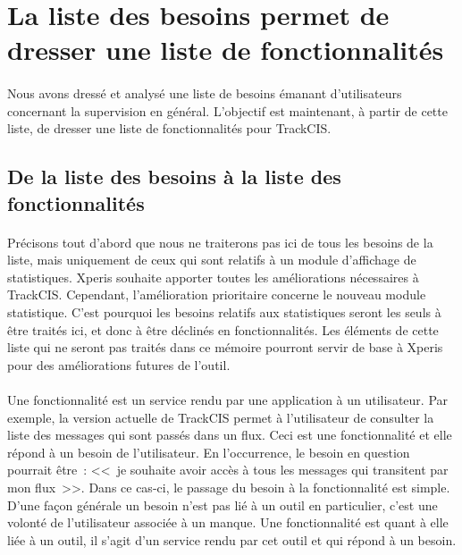 	\section{La liste des besoins permet de dresser une liste de fonctionnalités}
		\paragraph{}%
		Nous avons dressé et analysé une liste de besoins émanant d'utilisateurs
		concernant la supervision en général. L'objectif est maintenant, à partir de
		cette liste, de dresser une liste de fonctionnalités pour TrackCIS.
		
		\subsection{De la liste des besoins à la liste des fonctionnalités}
			\paragraph{}%
			Précisons tout d'abord que nous ne traiterons pas ici de tous les besoins de la
			liste, mais uniquement de ceux qui sont relatifs à un module d'affichage de
			statistiques. Xperis souhaite apporter toutes les améliorations nécessaires à
			TrackCIS. Cependant, l'amélioration prioritaire concerne le nouveau module
			statistique. C'est pourquoi les besoins relatifs aux statistiques seront
			les seuls à être traités ici, et donc à être déclinés en
			fonctionnalités.\newline
			Les éléments de cette liste qui ne seront pas traités dans ce mémoire
			pourront servir de base à Xperis pour des améliorations futures de l'outil.
		
			\paragraph{}%
			Une fonctionnalité est un service rendu par une application à un utilisateur.
			Par exemple, la version actuelle de TrackCIS permet à l'utilisateur de
			consulter la liste des messages qui sont passés dans un flux. Ceci est une
			fonctionnalité et elle répond à un besoin de l'utilisateur. En l'occurrence,
			le besoin en question pourrait être~: <<~je souhaite avoir accès à tous les
			messages qui transitent par mon flux~>>.
			Dans ce cas-ci, le passage du besoin à la fonctionnalité est simple. D’une
			façon générale un besoin n'est pas lié à un outil en particulier, c'est une
			volonté de l'utilisateur associée à un manque.
			Une fonctionnalité est quant à elle liée à un outil, il
			s'agit d'un service rendu par cet outil et qui répond à un besoin.
		
